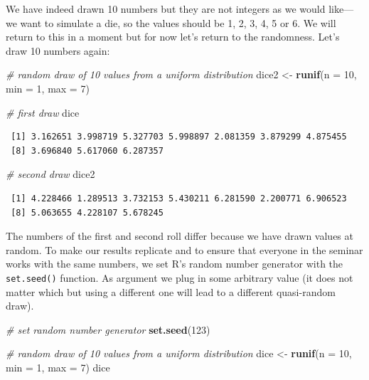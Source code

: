 \documentclass[]{article}
\newenvironment{Shaded}{\begin{snugshade}}{\end{snugshade}}
\newcommand{\KeywordTok}[1]{\textcolor[rgb]{0.13,0.29,0.53}{\textbf{#1}}}
\newcommand{\DataTypeTok}[1]{\textcolor[rgb]{0.13,0.29,0.53}{#1}}
\newcommand{\DecValTok}[1]{\textcolor[rgb]{0.00,0.00,0.81}{#1}}
\newcommand{\StringTok}[1]{\textcolor[rgb]{0.31,0.60,0.02}{#1}}
\newcommand{\CommentTok}[1]{\textcolor[rgb]{0.56,0.35,0.01}{\textit{#1}}}
\newcommand{\NormalTok}[1]{#1}
\theoremstyle{definition}
\theoremstyle{definition}
\theoremstyle{definition}
\theoremstyle{remark}
\begin{document}
We have indeed drawn 10 numbers but they are not integers as we would
like---we want to simulate a die, so the values should be 1, 2, 3, 4, 5
or 6. We will return to this in a moment but for now let's return to the
randomness. Let's draw 10 numbers again:

\begin{Shaded}
\begin{Highlighting}[]
\CommentTok{# random draw of 10 values from a uniform distribution}
\NormalTok{dice2 <-}\StringTok{ }\KeywordTok{runif}\NormalTok{(}\DataTypeTok{n =} \DecValTok{10}\NormalTok{, }\DataTypeTok{min =} \DecValTok{1}\NormalTok{, }\DataTypeTok{max =} \DecValTok{7}\NormalTok{)}

\CommentTok{# first draw}
\NormalTok{dice}
\end{Highlighting}
\end{Shaded}

\begin{verbatim}
 [1] 3.162651 3.998719 5.327703 5.998897 2.081359 3.879299 4.875455
 [8] 3.696840 5.617060 6.287357
\end{verbatim}

\begin{Shaded}
\begin{Highlighting}[]
\CommentTok{# second draw}
\NormalTok{dice2}
\end{Highlighting}
\end{Shaded}

\begin{verbatim}
 [1] 4.228466 1.289513 3.732153 5.430211 6.281590 2.200771 6.906523
 [8] 5.063655 4.228107 5.678245
\end{verbatim}

The numbers of the first and second roll differ because we have drawn
values at random. To make our results replicate and to ensure that
everyone in the seminar works with the same numbers, we set R's random
number generator with the \texttt{set.seed()} function. As argument we
plug in some arbitrary value (it does not matter which but using a
different one will lead to a different quasi-random draw).

\begin{Shaded}
\begin{Highlighting}[]
\CommentTok{# set random number generator}
\KeywordTok{set.seed}\NormalTok{(}\DecValTok{123}\NormalTok{)}

\CommentTok{# random draw of 10 values from a uniform distribution}
\NormalTok{dice <-}\StringTok{ }\KeywordTok{runif}\NormalTok{(}\DataTypeTok{n =} \DecValTok{10}\NormalTok{, }\DataTypeTok{min =} \DecValTok{1}\NormalTok{, }\DataTypeTok{max =} \DecValTok{7}\NormalTok{)}
\NormalTok{dice}
\end{Highlighting}
\end{Shaded}
\end{document}
